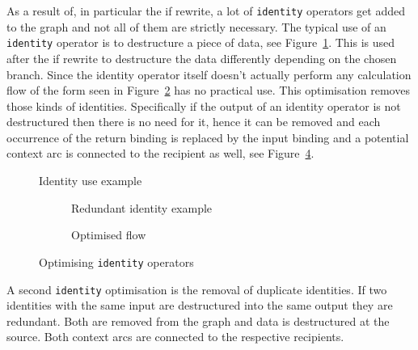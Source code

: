 As a result of, in particular the if rewrite, a lot of \texttt{identity} operators get added to the graph and not all of them are strictly necessary.
The typical use of an \texttt{identity} operator is to destructure a piece of data, see Figure~\ref{fig:identity-example}.
This is used after the if rewrite to destructure the data differently  depending on the chosen branch.
Since the identity operator itself doesn't actually perform any calculation flow of the form seen in Figure~\ref{fig:redundant-identity-example} has no practical use.
This optimisation removes those kinds of identities.
Specifically if the output of an identity operator is not destructured then there is no need for it, hence it can be removed and each occurrence of the return binding is replaced by the input binding and a potential context arc is connected to the recipient as well, see Figure~\ref{fig:redundant-identity-example-rewritten}.

\begin{figure}
    \caption{Identity use example}
    \label{fig:identity-example}
\end{figure}

\begin{figure}
    \begin{subfigure}[b]{.5\textwidth}
        \caption{Redundant identity example}
        \label{fig:redundant-identity-example}
    \end{subfigure}
    \begin{subfigure}[b]{.5\textwidth}
        \caption{Optimised flow}
        \label{fig:redundant-identity-example-rewritten}
    \end{subfigure}
    \caption{Optimising \texttt{identity} operators}

\end{figure}

A second \texttt{identity} optimisation is the removal of duplicate identities.
If two identities with the same input are destructured into the same output they are redundant.
Both are removed from the graph and data is destructured at the source.
Both context arcs are connected to the respective recipients.
